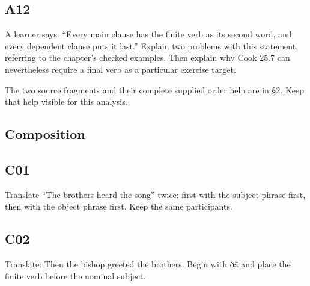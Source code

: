 \par\begin{minipage}{\linewidth}\raggedright
\subsection*{A12}

A learner says: “Every main clause has the finite verb as its second word, and every dependent clause puts it last.” Explain two problems with this statement, referring to the chapter’s checked examples. Then explain why Cook 25.7 can nevertheless require a final verb as a particular exercise target.

The two source fragments and their complete supplied order help are in §2. Keep that help visible for this analysis.

\end{minipage}\par\addvspace{4pt}

\subsection*{Composition}

\par\begin{minipage}{\linewidth}\raggedright
\subsection*{C01}

Translate “The brothers heard the song” twice: first with the subject phrase first, then with the object phrase first. Keep the same participants.

\end{minipage}\par\addvspace{4pt}

\par\begin{minipage}{\linewidth}\raggedright
\subsection*{C02}

Translate: Then the bishop greeted the brothers. Begin with ðā and place the finite verb before the nominal subject.

\end{minipage}\par\addvspace{4pt}


